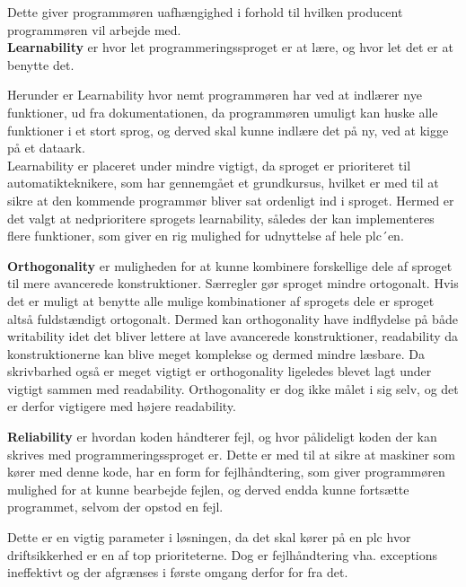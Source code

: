 Dette giver programmøren uafhængighed i forhold til hvilken producent programmøren vil arbejde med.\\

\noindent\textbf{Learnability} er hvor let programmeringssproget er at lære, og hvor let det er at benytte det.

Herunder er Learnability hvor nemt programmøren har ved at indlærer nye funktioner, ud fra dokumentationen, da programmøren umuligt kan huske alle funktioner i et stort sprog, og derved skal kunne indlære det på ny, ved at kigge på et dataark. \\
Learnability er placeret under mindre vigtigt, da sproget er prioriteret til automatikteknikere, som har gennemgået et grundkursus, hvilket er med til at sikre at den kommende programmør bliver sat ordenligt ind i sproget. Hermed er det valgt at nedprioritere sprogets learnability, således der kan implementeres flere funktioner, som giver en rig mulighed for udnyttelse af hele \gls{plc}´en.\\

\noindent\textbf{Orthogonality} er muligheden for at kunne kombinere forskellige dele af sproget til mere avancerede konstruktioner. Særregler gør sproget mindre ortogonalt. Hvis det er muligt at benytte alle mulige kombinationer af sprogets dele er sproget altså fuldstændigt ortogonalt. Dermed kan orthogonality have indflydelse på både writability idet det bliver lettere at lave avancerede konstruktioner, readability da konstruktionerne kan blive meget komplekse og dermed mindre læsbare. Da skrivbarhed også er meget vigtigt er orthogonality ligeledes blevet lagt under vigtigt sammen med readability. Orthogonality er dog ikke målet i sig selv, og det er derfor vigtigere med højere readability.\\

\noindent\textbf{Reliability} er hvordan koden håndterer fejl, og hvor pålideligt koden der kan skrives med programmeringssproget er. Dette er med til at sikre at maskiner som kører med denne kode, har en form for fejlhåndtering, som giver programmøren mulighed for at kunne bearbejde fejlen, og derved endda kunne fortsætte programmet, selvom der opstod en fejl.

Dette er en vigtig parameter i løsningen, da det skal kører på en \gls{plc} hvor driftsikkerhed er en af top prioriteterne. Dog er fejlhåndtering vha. exceptions ineffektivt og der afgrænses i første omgang derfor for fra det.\\


